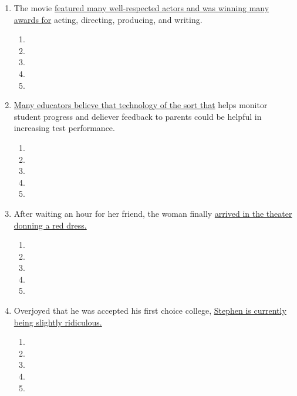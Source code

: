 \begin{enumerate}
\bigskip
\item The movie \ul{featured many well-respected actors and was winning many awards for} acting, directing, producing, and writing. 

\bigskip
\begin{enumerate}[label=(\Alph*)]
\item\hrulefill
\item\hrulefill
\item\hrulefill
\item\hrulefill
\item\hrulefill
\end{enumerate}

\bigskip
\item \ul{Many educators believe that technology of the sort that} helps monitor student progress and deliever feedback to parents could be helpful in increasing test performance. 

\bigskip
\begin{enumerate}[label=(\Alph*)]
\item\hrulefill
\item\hrulefill
\item\hrulefill
\item\hrulefill
\item\hrulefill
\end{enumerate}

\bigskip
\item After waiting an hour for her friend, the woman finally \ul{arrived in the theater donning a red dress.}

\bigskip
\begin{enumerate}[label=(\Alph*)]
\item\hrulefill
\item\hrulefill
\item\hrulefill
\item\hrulefill
\item\hrulefill
\end{enumerate}

\bigskip
\item Overjoyed that he was accepted his first choice college, \ul{Stephen is currently being slightly ridiculous.}

\bigskip
\begin{enumerate}[label=(\Alph*)]
\item\hrulefill
\item\hrulefill
\item\hrulefill
\item\hrulefill
\item\hrulefill
\end{enumerate}


\end{enumerate}
